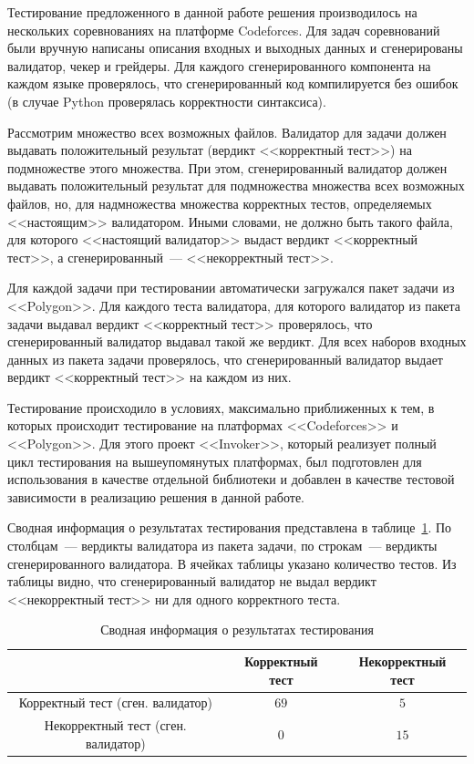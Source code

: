 \documentclass[times,specification,annotation]{style/itmo-student-thesis/itmo-student-thesis}
\begin{document}
Тестирование предложенного в данной работе решения производилось на нескольких соревнованиях на платформе Codeforces. Для задач соревнований были вручную написаны описания входных и выходных данных и сгенерированы валидатор, чекер и грейдеры. Для каждого сгенерированного компонента на каждом языке проверялось, что сгенерированный код компилируется без ошибок (в случае Python проверялась корректности синтаксиса).

Рассмотрим множество всех возможных файлов. Валидатор для задачи должен выдавать положительный результат (вердикт <<корректный тест>>) на подмножестве этого множества. При этом, сгенерированный валидатор должен выдавать положительный результат для подмножества множества всех возможных файлов, но, для надмножества множества корректных тестов, определяемых <<настоящим>> валидатором. Иными словами, не должно быть такого файла, для которого <<настоящий валидатор>> выдаст вердикт <<корректный тест>>, а сгенерированный~--- <<некорректный тест>>.

Для каждой задачи при тестировании автоматически загружался пакет задачи из <<Polygon>>. Для каждого теста валидатора, для которого валидатор из пакета задачи выдавал вердикт <<корректный тест>> проверялось, что сгенерированный валидатор выдавал такой же вердикт. Для всех наборов входных данных из пакета задачи проверялось, что сгенерированный валидатор выдает вердикт <<корректный тест>> на каждом из них. 

Тестирование происходило в условиях, максимально приближенных к тем, в которых происходит тестирование на платформах <<Codeforces>> и <<Polygon>>. Для этого проект <<Invoker>>, который реализует полный цикл тестирования на вышеупомянутых платформах, был подготовлен для использования в качестве отдельной библиотеки и добавлен в качестве тестовой зависимости в реализацию решения в данной работе.

Сводная информация о результатах тестирования представлена в таблице~\ref{testing}. По столбцам~--- вердикты валидатора из пакета задачи, по строкам~--- вердикты сгенерированного валидатора. В ячейках таблицы указано количество тестов. Из таблицы видно, что сгенерированный валидатор не выдал вердикт <<некорректный тест>> ни для одного корректного теста. 

\begin{table}[!h]
\caption{Сводная информация о результатах тестирования}\label{testing}
\centering
\begin{tabular}{|*{3}{c|}}\hline
 & Корректный тест & Некорректный тест \\\hline
Корректный тест (сген. валидатор)   & $69$ & $5$ \\\hline
Некорректный тест (сген. валидатор) & $0$ & $15$ \\\hline
\end{tabular}
\end{table}
\end{document}
